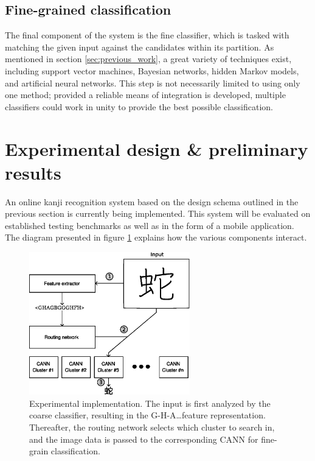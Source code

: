 \documentclass[10pt,conference,a4paper]{IEEEtran}
\begin{document}
	\subsection{Fine-grained classification}

	The final component of the system is the fine classifier, which is tasked with matching the
	given input against the candidates within its partition. As mentioned in section \ref{sec:previous_work}, a great
	variety of techniques exist, including support vector machines, Bayesian networks, hidden Markov models, and artificial neural networks.
	This step is not necessarily limited to using only one method; provided a reliable means of integration is developed,
	multiple classifiers could work in unity to provide the best possible classification.



	\section{Experimental design \& preliminary results}
	\label{sec:experiments}

	An online kanji recognition system based on the design schema outlined in the previous section is
	currently being implemented. This system will be evaluated on established testing benchmarks
	as well as in the form of a mobile application. The diagram presented in figure \ref{fig_experimental_implementation} 
	explains how the various components interact.

	\begin{figure}
		\centering
		\includegraphics[width=2.75in]{./fig/experimental-implementation.eps}
		\caption{Experimental implementation. The input is first analyzed by the coarse classifier, resulting in the G-H-A\ldots feature representation.
		Thereafter, the routing network selects which cluster to search in, and the image data is passed to the corresponding CANN for fine-grain classification.}
		\label{fig_experimental_implementation}
	\end{figure}
\end{document}
